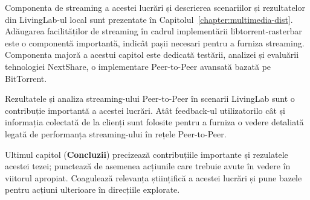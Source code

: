 Componenta de streaming a acestei lucrări și descrierea scenariilor și
rezultatelor din LivingLab-ul local sunt prezentate în
Capitolul~\ref{chapter:multimedia-dist}. Adăugarea facilităților de streaming
în cadrul implementării libtorrent-rasterbar este o componentă importantă,
indicât pașii necesari pentru a furniza streaming. Componenta majoră a acestui
capitol este dedicată testării, analizei și evaluării tehnologiei NextShare, o
implementare Peer-to-Peer avansată bazată pe BitTorrent.

Rezultatele și analiza streaming-ului Peer-to-Peer în scenarii LivingLab sunt
o contribuție importantă a acestei lucrări. Atât feedback-ul utilizatorilo cât
și informația colectată de la clienți sunt folosite pentru a furniza o vedere
detaliată legată de performanța streaming-ului în rețele Peer-to-Peer.

Ultimul capitol (\textbf{Concluzii}) precizează contribuțiile importante și
rezulatele acestei tezei; punctează de asemenea acțiunile care trebuie avute
în vedere în viitorul apropiat. Coagulează relevanța științifică a acestei
lucrări și pune bazele pentru acțiuni ulterioare în direcțiile explorate.
